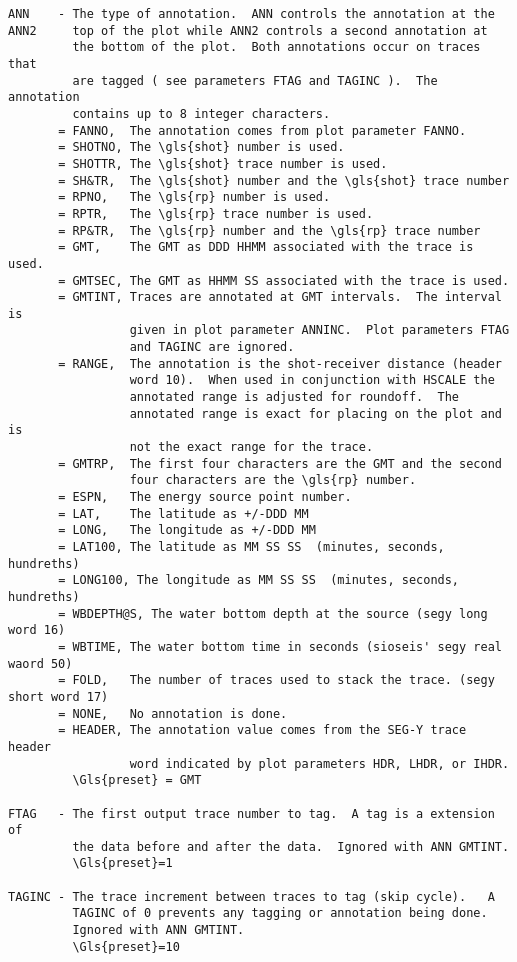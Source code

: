 \begin{verbatim}
ANN    - The type of annotation.  ANN controls the annotation at the
ANN2     top of the plot while ANN2 controls a second annotation at
         the bottom of the plot.  Both annotations occur on traces that
         are tagged ( see parameters FTAG and TAGINC ).  The annotation
         contains up to 8 integer characters.
       = FANNO,  The annotation comes from plot parameter FANNO.
       = SHOTNO, The \gls{shot} number is used.
       = SHOTTR, The \gls{shot} trace number is used.
       = SH&TR,  The \gls{shot} number and the \gls{shot} trace number
       = RPNO,   The \gls{rp} number is used.
       = RPTR,   The \gls{rp} trace number is used.
       = RP&TR,  The \gls{rp} number and the \gls{rp} trace number
       = GMT,    The GMT as DDD HHMM associated with the trace is used.
       = GMTSEC, The GMT as HHMM SS associated with the trace is used.
       = GMTINT, Traces are annotated at GMT intervals.  The interval is
                 given in plot parameter ANNINC.  Plot parameters FTAG
                 and TAGINC are ignored.
       = RANGE,  The annotation is the shot-receiver distance (header
                 word 10).  When used in conjunction with HSCALE the
                 annotated range is adjusted for roundoff.  The
                 annotated range is exact for placing on the plot and is
                 not the exact range for the trace.
       = GMTRP,  The first four characters are the GMT and the second
                 four characters are the \gls{rp} number.
       = ESPN,   The energy source point number.
       = LAT,    The latitude as +/-DDD MM
       = LONG,   The longitude as +/-DDD MM
       = LAT100, The latitude as MM SS SS  (minutes, seconds, hundreths)
       = LONG100, The longitude as MM SS SS  (minutes, seconds, hundreths)
       = WBDEPTH@S, The water bottom depth at the source (segy long word 16)
       = WBTIME, The water bottom time in seconds (sioseis' segy real waord 50)
       = FOLD,   The number of traces used to stack the trace. (segy short word 17)
       = NONE,   No annotation is done.
       = HEADER, The annotation value comes from the SEG-Y trace header
                 word indicated by plot parameters HDR, LHDR, or IHDR.
         \Gls{preset} = GMT

FTAG   - The first output trace number to tag.  A tag is a extension of
         the data before and after the data.  Ignored with ANN GMTINT.
         \Gls{preset}=1

TAGINC - The trace increment between traces to tag (skip cycle).   A
         TAGINC of 0 prevents any tagging or annotation being done.
         Ignored with ANN GMTINT.
         \Gls{preset}=10


\end{verbatim}
